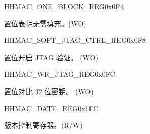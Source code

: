 \begin{register}{H}{HMAC\_ONE\_BLOCK\_REG}{0x{}0F4}\label{regdesc:HMACONEBLOCKREG}
%
%
\regnewline%
\begin{regdesc}\begin{reglist}
\label{fielddesc:HMACSETONEBLOCK}\item [HMAC\_SET\_ONE\_BLOCK] 置位表明无需填充。(WO)
\end{reglist}\end{regdesc}
\end{register}


\begin{register}{H}{HMAC\_SOFT\_JTAG\_CTRL\_REG}{0x{}0F8}\label{regdesc:HMACSOFTJTAGCTRLREG}
%
%
\regnewline%
\begin{regdesc}\begin{reglist}
\label{fielddesc:HMACSOFTJTAGCTRL}\item [HMAC\_SOFT\_JTAG\_CTRL] 置位开启 JTAG 验证。 (WO)
\end{reglist}\end{regdesc}
\end{register}

\begin{register}{H}{HMAC\_WR\_JTAG\_REG}{0x{}0FC}\label{regdesc:HMACWRJTAGREG}
%
\regnewline%
\begin{regdesc}\begin{reglist}
\label{fielddesc:HMACWRJTAG}\item [HMAC\_WR\_JTAG] 置位对比 32 位密钥。 (WO)
\end{reglist}\end{regdesc}
\end{register}


\begin{register}{H}{HMAC\_DATE\_REG}{0x{}1FC}\label{regdesc:HMACDATEREG}
%
%
\regnewline%
\begin{regdesc}\begin{reglist}
\label{fielddesc:HMACDATE}\item [HMAC\_DATE] 版本控制寄存器。(R/W)
\end{reglist}\end{regdesc}
\end{register}
